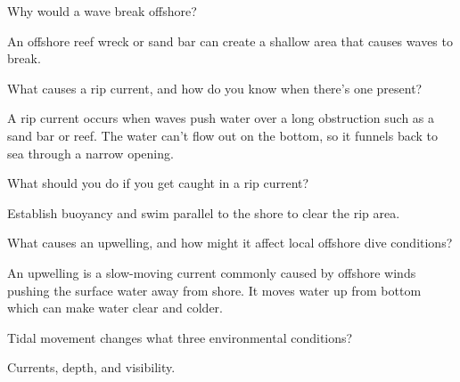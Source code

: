 	\begin{qanda}
		\begin{question}
Why would a wave break offshore?
		\end{question}

		\begin{answer}
An offshore reef wreck or sand bar can create a shallow area that causes waves to break.
		\end{answer}
	\end{qanda}

	\begin{qanda}
		\begin{question}
What causes a rip current, and how do you know when there's one present?
		\end{question}

		\begin{answer}
A rip current occurs when waves push water over a long obstruction such as a sand bar or reef.  The water can't flow out on the bottom, so it funnels back to sea through a narrow opening.
		\end{answer}
	\end{qanda}

	\begin{qanda}
		\begin{question}
What should you do if you get caught in a rip current?
		\end{question}

		\begin{answer}
Establish buoyancy and swim parallel to the shore to clear the rip area.
		\end{answer}
	\end{qanda}

	\begin{qanda}
		\begin{question}
What causes an upwelling, and how might it affect local offshore dive conditions?
		\end{question}

		\begin{answer}
An upwelling is a slow-moving current commonly caused by offshore winds pushing the surface water away from shore.  It moves water up from bottom which can make water clear and colder.
		\end{answer}
	\end{qanda}

	\begin{qanda}
		\begin{question}
Tidal movement changes what three environmental conditions?
		\end{question}

		\begin{answer}
Currents, depth, and visibility.
		\end{answer}
	\end{qanda}

